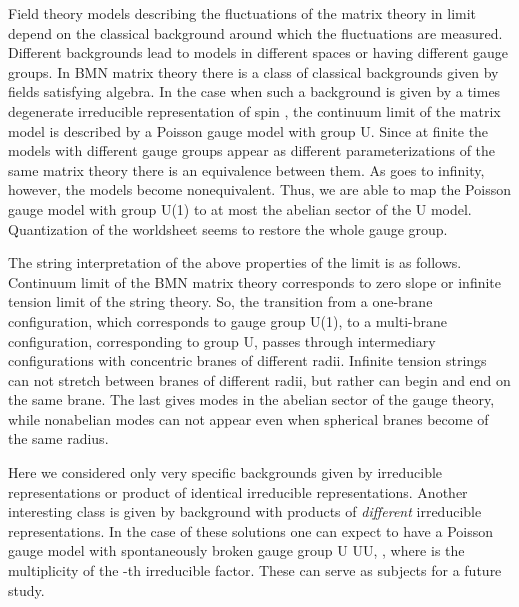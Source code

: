\documentclass[a4paper]{article}
\begin{document}
Field theory models describing the fluctuations of the matrix
theory in \coordHE{} limit depend on the classical background
around which the fluctuations are measured. Different backgrounds
lead to models in different spaces or having different gauge
groups. In BMN matrix theory there is a class of classical
backgrounds given by fields satisfying \coordHE{} algebra. In the
case when such a background is given by a \coordHE{} times degenerate
irreducible representation of spin \coordHE{}, the continuum
limit of the matrix model is described by a Poisson gauge model
with group U\coordHE{}. Since at finite \coordHE{} the models with different
gauge groups appear as different parameterizations of the same
matrix theory there is an equivalence between them. As \coordHE{} goes to
infinity, however, the models become nonequivalent. Thus, we are
able to map the Poisson gauge model with group U(1) to at most the
abelian sector of the U\coordHE{} model. Quantization of the worldsheet
seems to restore the whole gauge group.

The string interpretation of the above properties of the limit is
as follows. Continuum limit of the BMN matrix theory corresponds
to zero slope or infinite tension limit of the string theory. So,
the transition from a one-brane configuration, which corresponds
to gauge group U(1), to a multi-brane configuration, corresponding
to group U\coordHE{}, passes through intermediary configurations with
concentric branes of different radii. Infinite tension strings can
not stretch between branes of different radii, but rather can
begin and end on the same brane. The last gives modes in the
abelian sector of the gauge theory, while nonabelian modes can not
appear even when spherical branes become of the same radius.

Here we considered only very specific backgrounds given by
irreducible representations or product of identical irreducible
representations. Another interesting class is given by background
with products of \emph{different} irreducible representations. In
the case of these solutions one can expect to have a Poisson gauge
model with spontaneously broken gauge group U\coordHE{}  \myHighlight{$\to$}\coordHE{}
U\coordHE{}U\coordHE{}, \coordHE{}, where \coordHE{}
is the multiplicity of the \coordHE{}-th irreducible factor. These can
serve as subjects for a future study.
\end{document}
